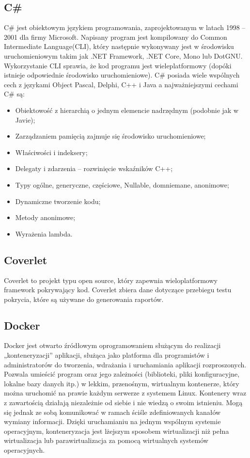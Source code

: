 \documentclass[12pt,a4paper]{article}
\begin{document}
		\subsection{C\#}
			\indent C\# jest obiektowym językiem programowania, zaprojektowanym w latach 1998 – 2001 dla firmy Microsoft.
			Napisany program jest kompilowany do Common Intermediate Language(CLI), który następnie wykonywany jest w środowisku uruchomieniowym takim jak .NET Framework,
			.NET Core, Mono lub DotGNU.
			Wykorzystanie CLI sprawia, że kod programu jest wieleplatformowy (dopóki istnieje odpowiednie środowisko uruchomieniowe).
			C\# posiada wiele wspólnych cech z językami Object Pascal, Delphi, C++ i Java a najważniejszymi cechami C\# są:
			\begin{itemize}
				\item Obiektowość z hierarchią o jednym elemencie nadrzędnym (podobnie jak w Javie);
				\item Zarządzaniem pamięcią zajmuje się środowisko uruchomieniowe;
				\item Właściwości i indeksery;
				\item Delegaty i zdarzenia – rozwinięcie wskaźników C++;
				\item Typy ogólne, generyczne, częściowe, Nullable, domniemane, anonimowe;
				\item Dynamiczne tworzenie kodu;
				\item Metody anonimowe;
				\item Wyrażenia lambda.
			\end{itemize}
		
		\subsection{Coverlet}
			\indent Coverlet to projekt typu open source, który zapewnia wieloplatformowy framework
			pokrywający kod. Coverlet zbiera dane dotyczące przebiegu testu pokrycia,
			które są używane do generowania raportów.

		\subsection{Docker}
			\indent Docker jest otwarto źródłowym oprogramowaniem służącym do realizacji „konteneryzacji” aplikacji, służąca jako platforma dla programistów
				i administratorów do tworzenia, wdrażania i uruchamiania aplikacji rozproszonych. Pozwala umieścić program oraz jego zależności (biblioteki,
				pliki konfiguracyjne, lokalne bazy danych itp.) w lekkim, przenośnym, wirtualnym kontenerze, który można uruchomić na prawie każdym serwerze
				z systemem Linux. Kontenery wraz z zawartością działają niezależnie od siebie i nie wiedzą o swoim istnieniu. Mogą się jednak ze sobą
				komunikować w ramach ściśle zdefiniowanych kanałów wymiany informacji. Dzięki uruchamianiu na jednym wspólnym systemie operacyjnym,
				konteneryzacja jest lżejszym sposobem wirtualizacji niż pełna wirtualizacja lub parawirtualizacja za pomocą wirtualnych systemów
				operacyjnych.
				 	
\end{document}
